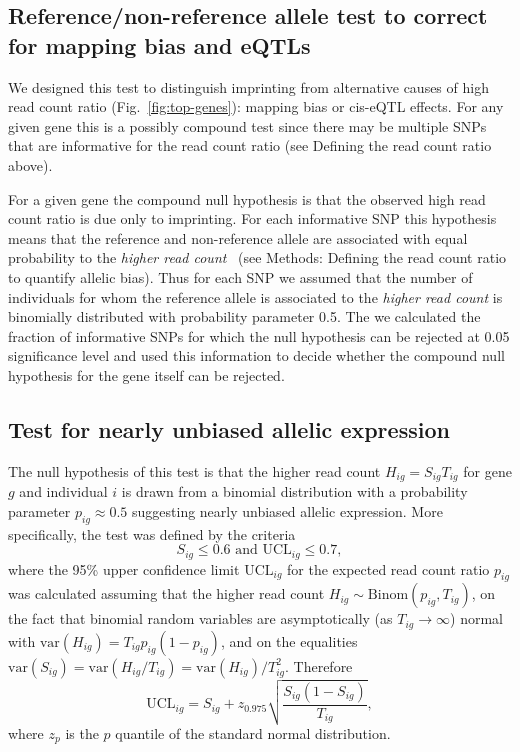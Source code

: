 \documentclass[letterpaper]{article}
\begin{document}
\subsection{Reference/non-reference allele test to correct for mapping bias
and eQTLs}

We designed this test to distinguish imprinting from alternative causes of
high read count ratio (Fig.~\ref{fig:top-genes}): mapping bias or cis-eQTL
effects.  For any given gene this is a possibly compound test since there may
be multiple SNPs that are informative for the read count ratio (see Defining
the read count ratio above).

For a given gene the compound null hypothesis is that the observed high read
count ratio is due only to imprinting.  For each informative SNP this
hypothesis means that the reference and non-reference allele are associated
with equal probability to the \emph{higher read count}~\cite{Babak2015} (see Methods: Defining
the read count ratio to quantify allelic bias).  Thus for each SNP we assumed
that the number of individuals for whom the reference allele is associated to
the \emph{higher read count} is binomially distributed with probability
parameter 0.5.  The we calculated the fraction of informative SNPs for which the
null hypothesis can be rejected at 0.05 significance level and used this
information to decide whether the compound null hypothesis for the gene itself
can be rejected.

\subsection{Test for nearly unbiased allelic expression}

The null hypothesis of this test is that the higher read count
\(H_{ig}=S_{ig}T_{ig}\) for gene \(g\) and individual \(i\) is drawn from a
binomial distribution with a probability parameter \(p_{ig}\approx 0.5\)
suggesting nearly unbiased allelic expression.  More specifically, the test
was defined by the criteria
\begin{equation}
S_{ig} \le 0.6 \text{ and } \mathrm{UCL}_{ig} \le 0.7,
\label{eq:unbiased-test}
\end{equation}
where the 95\% upper confidence limit \(\mathrm{UCL}_{ig}\) for the expected
read count ratio \(p_{ig}\) was calculated assuming that the higher read count
\(H_{ig}\sim \mathrm{Binom}(p_{ig}, T_{ig})\), on the fact that binomial
random variables are asymptotically (as \(T_{ig}\rightarrow \infty\)) normal
with \(\mathrm{var}(H_{ig}) = T_{ig}p_{ig}(1-p_{ig})\), and on the equalities
\(\mathrm{var}(S_{ig}) = \mathrm{var}(H_{ig}/T_{ig}) =
\mathrm{var}(H_{ig})/T_{ig}^2\).  Therefore
\begin{equation}
\mathrm{UCL}_{ig} = S_{ig} + z_{0.975} \sqrt{\frac{S_{ig} (1 - S_{ig})}{T_{ig}}},
\end{equation}
where $z_{p}$ is the $p$ quantile of the standard normal distribution.
\end{document}
